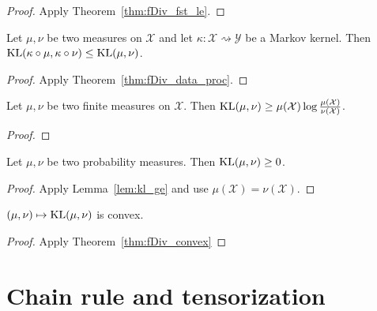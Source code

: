 \begin{proof}
Apply Theorem~\ref{thm:fDiv_fst_le}.
\end{proof}

\begin{theorem}
  \label{thm:kl_data_proc}
  Let $\mu, \nu$ be two measures on $\mathcal X$ and let $\kappa : \mathcal X \rightsquigarrow \mathcal Y$ be a Markov kernel.
  Then $\mathrm{KL}(\kappa \circ \mu, \kappa \circ \nu) \le \mathrm{KL}(\mu, \nu)$.
\end{theorem}

\begin{proof}
Apply Theorem~\ref{thm:fDiv_data_proc}.
\end{proof}

\begin{lemma}
  \label{lem:kl_ge}
  \leanok
  Let $\mu, \nu$ be two finite measures on $\mathcal X$. Then $\mathrm{KL}(\mu, \nu) \ge \mu(\mathcal X) \log \frac{\mu(\mathcal X)}{\nu(\mathcal X)}$.
\end{lemma}

\begin{proof}\leanok
{}
\end{proof}

\begin{lemma}
  \label{lem:kl_nonneg}
  \leanok
  Let $\mu, \nu$ be two probability measures. Then $\mathrm{KL}(\mu, \nu) \ge 0$.
\end{lemma}

\begin{proof}\leanok
{}
Apply Lemma~\ref{lem:kl_ge} and use $\mu(\mathcal X) = \nu (\mathcal X)$.
\end{proof}

\begin{lemma}
  \label{lem:kl_convex}
  $(\mu, \nu) \mapsto \mathrm{KL}(\mu, \nu)$ is convex.
\end{lemma}

\begin{proof}
Apply Theorem~\ref{thm:fDiv_convex}
\end{proof}

\section{Chain rule and tensorization}

